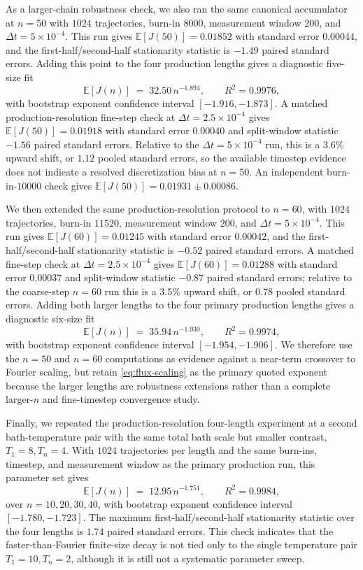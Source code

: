 \documentclass[11pt,a4paper]{article}
\theoremstyle{definition}
\newcommand{\E}{\mathbb{E}}
\numberwithin{equation}{section}   %
\begin{document}
As a larger-chain robustness check, we also ran the same canonical accumulator
at $n=50$ with $1024$ trajectories, burn-in $8000$, measurement window $200$,
and $\Delta t=5\times10^{-4}$. This run gives
$\E[J(50)]=0.01852$ with standard error $0.00044$, and the
first-half/second-half stationarity statistic is $-1.49$ paired standard
errors. Adding this point to the four production lengths gives a diagnostic
five-size fit
\[
  \E[J(n)] \;=\; 32.50\,n^{-1.894},
  \qquad R^2=0.9976,
\]
with bootstrap exponent confidence interval $[-1.916,-1.873]$. A matched
production-resolution fine-step check at $\Delta t=2.5\times10^{-4}$ gives
$\E[J(50)]=0.01918$ with standard error $0.00040$ and split-window statistic
$-1.56$ paired standard errors. Relative to the $\Delta t=5\times10^{-4}$
run, this is a $3.6\%$ upward shift, or $1.12$ pooled standard errors, so the
available timestep evidence does not indicate a resolved discretization bias
at $n=50$. An independent burn-in-$10000$ check gives
$\E[J(50)]=0.01931\pm0.00086$.

We then extended the same production-resolution protocol to $n=60$, with
$1024$ trajectories, burn-in $11520$, measurement window $200$, and
$\Delta t=5\times10^{-4}$. This run gives
$\E[J(60)]=0.01245$ with standard error $0.00042$, and the
first-half/second-half stationarity statistic is $-0.52$ paired standard
errors. A matched fine-step check at $\Delta t=2.5\times10^{-4}$ gives
$\E[J(60)]=0.01288$ with standard error $0.00037$ and split-window statistic
$-0.87$ paired standard errors; relative to the coarse-step $n=60$ run this is
a $3.5\%$ upward shift, or $0.78$ pooled standard errors. Adding both larger lengths to the four primary production lengths gives
a diagnostic six-size fit
\[
  \E[J(n)] \;=\; 35.94\,n^{-1.930},
  \qquad R^2=0.9974,
\]
with bootstrap exponent confidence interval $[-1.954,-1.906]$. We therefore
use the $n=50$ and $n=60$ computations as evidence against a near-term
crossover to Fourier scaling, but retain \eqref{eq:flux-scaling} as the
primary quoted exponent because the larger lengths are robustness extensions
rather than a complete larger-$n$ and fine-timestep convergence study.

Finally, we repeated the production-resolution four-length experiment at a
second bath-temperature pair with the same total bath scale but smaller
contrast, $T_1=8,T_n=4$.  With $1024$ trajectories per length and the same
burn-ins, timestep, and measurement window as the primary production run, this
parameter set gives
\[
  \E[J(n)] \;=\; 12.95\,n^{-1.751},
  \qquad R^2=0.9984,
\]
over $n=10,20,30,40$, with bootstrap exponent confidence interval
$[-1.780,-1.723]$.  The maximum first-half/second-half stationarity statistic
over the four lengths is $1.74$ paired standard errors.  This check indicates
that the faster-than-Fourier finite-size decay is not tied only to the single
temperature pair $T_1=10,T_n=2$, although it is still not a systematic
parameter sweep.
\end{document}
